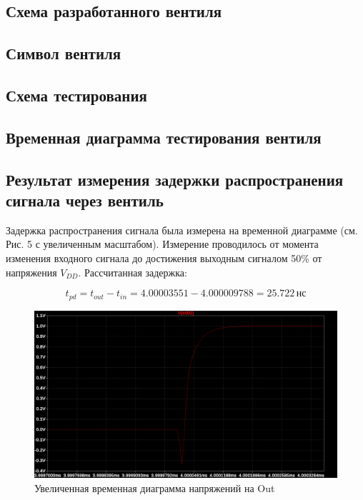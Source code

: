 \subsection{Схема разработанного вентиля}


\subsection{Символ вентиля}


\subsection{Схема тестирования}


\subsection{Временная диаграмма тестирования вентиля}


\subsection{Результат измерения задержки распространения сигнала через вентиль}
Задержка распространения сигнала была измерена на временной диаграмме (см. Рис. 5 с увеличенным масштабом). Измерение проводилось от момента изменения входного сигнала до достижения выходным сигналом 50\% от напряжения \( V_{DD} \). Рассчитанная задержка:

\[
	t_{pd} = t_{out} - t_{in} = 4.00003551 - 4.000009788 = 25.722 \, \text{нс}
\]

\begin{figure}[H]
	\centering
	\includegraphics[width=1\textwidth]{../data/t_delay_zoomed}
	\caption{Увеличенная временная диаграмма напряжений на Out}
\end{figure}

